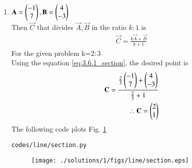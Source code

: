 \renewcommand{\theequation}{\theenumi}
\begin{enumerate}[label=\arabic*.,ref=\thesubsubsection.\theenumi]
\item  
$\mathbf{A}=\begin{pmatrix}-1\\7\end{pmatrix}, \mathbf{B}=\begin{pmatrix}4\\-3\end{pmatrix}$
\\
Then $\vec{C}$ that divides $\vec{A},\vec{B}$ in the ratio $k:1$ is
\begin{align}
\label{eq:3.6.1_section}
\vec{C}=\frac{k\vec{A}+\vec{B}}{k+1}
\end{align}
For the given problem k=$2:3$
\\
Using the equation \ref{eq:3.6.1_section}, the desired point is
\begin{align}
\mathbf{C}=\frac{\frac{2}{3}\begin{pmatrix}-1\\7\end{pmatrix}+\begin{pmatrix}4\\-3\end{pmatrix}}{\frac{2}{3}+1}
\\
\therefore \mathbf{C}=\begin{pmatrix}2\\1\end{pmatrix}
\end{align}
The following code plots Fig.  \ref{fig:3.6.1_section}
\begin{lstlisting}
codes/line/section.py
\end{lstlisting}
\begin{figure}[!ht]
\texttt{[image: ./solutions/1/figs/line/section.eps]}
\caption{}
\label{fig:3.6.1_section}
\end{figure}
\end{enumerate}
